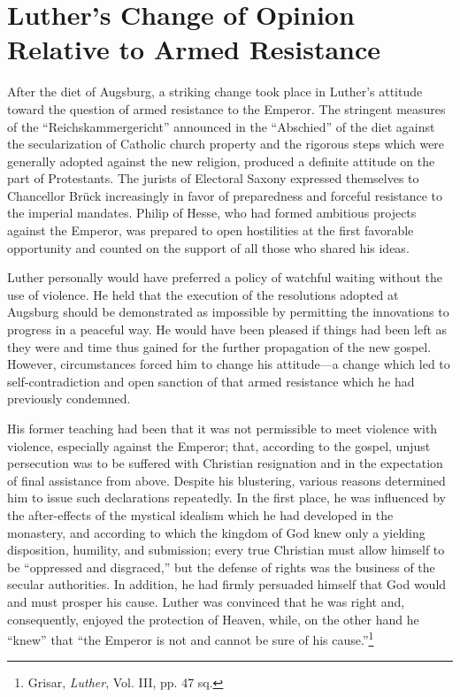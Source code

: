 \section{Luther’s Change of Opinion Relative to Armed Resistance}

After the diet of Augsburg, a striking change took place in Luther’s attitude
toward the question of armed resistance to the Emperor.
The stringent measures of the “Reichskammergericht” announced in the
“Abschied” of the diet against the secularization of
Catholic church property and the rigorous steps which were generally adopted
against the new religion, produced a definite attitude on
the part of Protestants. The jurists of Electoral Saxony expressed
themselves to Chancellor Brück increasingly in favor of preparedness
and forceful resistance to the imperial mandates. Philip of Hesse, who
had formed ambitious projects against the Emperor, was prepared to
open hostilities at the first favorable opportunity and counted on the
support of all those who shared his ideas.

Luther personally would have preferred a policy of watchful
waiting without the use of violence. He held that the execution of
the resolutions adopted at Augsburg should be demonstrated as impossible
by permitting the innovations to progress in a peaceful way.
He would have been pleased if things had been left as they were and
time thus gained for the further propagation of the new gospel.
However, circumstances forced him to change his attitude—a change
which led to self-contradiction and open sanction of that armed resistance
which he had previously condemned.

His former teaching had been that it was not permissible to meet
violence with violence, especially against the Emperor; that, according
to the gospel, unjust persecution was to be suffered with Christian
resignation and in the expectation of final assistance from above.
Despite his blustering, various reasons determined him to issue such
declarations repeatedly. In the first place, he was influenced by the
after-effects of the mystical idealism which he had developed in the
monastery, and according to which the kingdom of God knew only
a yielding disposition, humility, and submission; every true Christian
must allow himself to be “oppressed and disgraced,” but the defense
of rights was the business of the secular authorities. In addition,
he had firmly persuaded himself that God would and must prosper his
cause. Luther was convinced that he was right and, consequently,
enjoyed the protection of Heaven, while, on the other hand he
“knew” that “the Emperor is not and cannot be sure of his cause.”\footnote{Grisar, \textit{Luther}, Vol. III, pp. 47 sq.}


